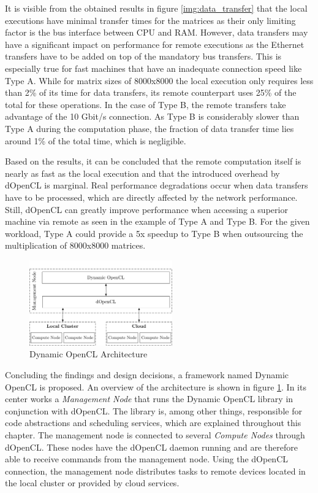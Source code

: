 It is visible from the obtained results in figure \ref{img:data_transfer} that the local executions have minimal transfer times for the matrices as their only limiting factor is the bus interface between CPU and RAM. However, data transfers may have a significant impact on performance for remote executions as the Ethernet transfers have to be added on top of the mandatory bus transfers. This is especially true for fast machines that have an inadequate connection speed like Type A. While for matrix sizes of 8000x8000 the local execution only requires less than 2\% of its time for data transfers, its remote counterpart uses 25\% of the total for these operations. In the case of Type B, the remote transfers take advantage of the 10 Gbit/s connection. As Type B is considerably slower than Type A during the computation phase, the fraction of data transfer time lies around 1\% of the total time, which is negligible.

Based on the results, it can be concluded that the remote computation itself is nearly as fast as the local execution and that the introduced overhead by dOpenCL is marginal. Real performance degradations occur when data transfers have to be processed, which are directly affected by the network performance. Still, dOpenCL can greatly improve performance when accessing a superior machine via remote as seen in the example of Type A and Type B. For the given workload, Type A could provide a 5x speedup to Type B when outsourcing the multiplication of 8000x8000 matrices.

\begin{figure}[H]

	\includegraphics[width=0.55\textwidth]{drawings/dynamic_opencl_arch.pdf}
	\centering
	\caption{Dynamic OpenCL Architecture}
	\label{img:dynamic_opencl_arch}
\end{figure}
Concluding the findings and design decisions, a framework named Dynamic OpenCL is proposed. An overview of the architecture is shown in figure \ref{img:dynamic_opencl_arch}. In its center works a \textit{Management Node} that runs the Dynamic OpenCL library in conjunction with dOpenCL. The library is, among other things, responsible for code abstractions and scheduling services, which are explained throughout this chapter. The management node is connected to several \textit{Compute Nodes} through dOpenCL. These nodes have the dOpenCL daemon running and are therefore able to receive commands from the management node. Using the dOpenCL connection, the management node distributes tasks to remote devices located in the local cluster or provided by cloud services.


